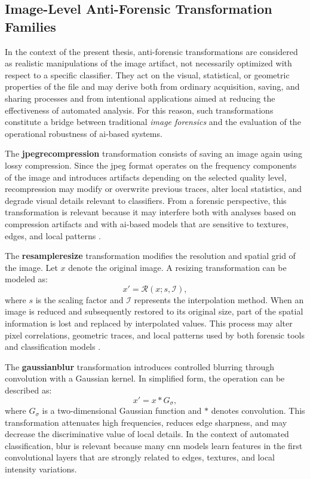 \subsection{Image-Level Anti-Forensic Transformation Families}
\label{subsec:background_antiforensic_transformations}
In the context of the present thesis, anti-forensic transformations are
considered as realistic manipulations of the image artifact, not necessarily
optimized with respect to a specific classifier. They act on the visual,
statistical, or geometric properties of the file and may derive both from
ordinary acquisition, saving, and sharing processes and from intentional
applications aimed at reducing the effectiveness of automated analysis. For
this reason, such transformations constitute a bridge between traditional
\textit{image forensics} and the evaluation of the operational robustness of
\gls{ai}-based systems.

The \textbf{\gls{jpegrecompression}} transformation consists of saving an image
again using lossy compression. Since the \gls{jpeg} format operates on the
frequency components of the image and introduces artifacts depending on the
selected quality level, recompression may modify or overwrite previous traces,
alter local statistics, and degrade visual details relevant to classifiers.
From a forensic perspective, this transformation is relevant because it may
interfere both with analyses based on compression artifacts and with
\gls{ai}-based models that are sensitive to textures, edges, and local patterns
\cite{stamm2010anti,stamm2013information}.

The \textbf{\gls{resampleresize}} transformation modifies the resolution and
spatial grid of the image. Let \(x\) denote the original image. A resizing
transformation can be modeled as:
\[
x' = \mathcal{R}(x; s, \mathcal{I}),
\]
where \(s\) is the scaling factor and \(\mathcal{I}\) represents the
interpolation method. When an image is reduced and subsequently restored to its
original size, part of the spatial information is lost and replaced by
interpolated values. This process may alter pixel correlations, geometric
traces, and local patterns used by both forensic tools and classification
models \cite{popescu2005exposing,farid2016photo}.

The \textbf{\gls{gaussianblur}} transformation introduces controlled blurring
through convolution with a Gaussian kernel. In simplified form, the operation
can be described as:
\[
x' = x * G_{\sigma},
\]
where \(G_{\sigma}\) is a two-dimensional Gaussian function and \(*\) denotes
convolution. This transformation attenuates high frequencies, reduces edge
sharpness, and may decrease the discriminative value of local details. In the
context of automated classification, blur is relevant because many \gls{cnn}
models learn features in the first convolutional layers that are strongly
related to edges, textures, and local intensity variations.

